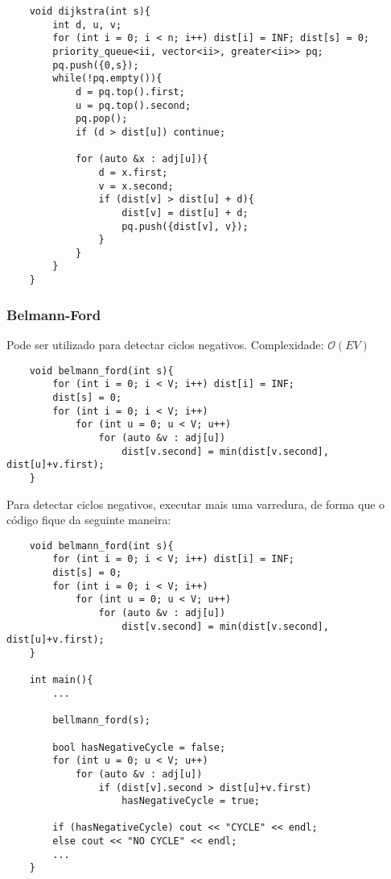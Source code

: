 \begin{verbatim}
    void dijkstra(int s){
        int d, u, v;
        for (int i = 0; i < n; i++) dist[i] = INF; dist[s] = 0;
        priority_queue<ii, vector<ii>, greater<ii>> pq;
        pq.push({0,s});
        while(!pq.empty()){
            d = pq.top().first;
            u = pq.top().second;
            pq.pop();
            if (d > dist[u]) continue;

            for (auto &x : adj[u]){
                d = x.first;
                v = x.second;
                if (dist[v] > dist[u] + d){
                    dist[v] = dist[u] + d; 
                    pq.push({dist[v], v});
                }   
            }
        }
    }

\end{verbatim}

\subsubsection{Belmann-Ford}
\par Pode ser utilizado para detectar ciclos negativos.
Complexidade: $\mathcal{O}(EV)$

\begin{verbatim}
    void belmann_ford(int s){
        for (int i = 0; i < V; i++) dist[i] = INF;
        dist[s] = 0;
        for (int i = 0; i < V; i++)
            for (int u = 0; u < V; u++)
                for (auto &v : adj[u])
                    dist[v.second] = min(dist[v.second], dist[u]+v.first);
    }
\end{verbatim}

\par Para detectar ciclos negativos, executar mais uma varredura, de forma que o código 
fique da seguinte maneira:

\begin{verbatim}
    void belmann_ford(int s){
        for (int i = 0; i < V; i++) dist[i] = INF;
        dist[s] = 0;
        for (int i = 0; i < V; i++)
            for (int u = 0; u < V; u++)
                for (auto &v : adj[u])
                    dist[v.second] = min(dist[v.second], dist[u]+v.first);
    }

    int main(){
        ...

        bellmann_ford(s);

        bool hasNegativeCycle = false;
        for (int u = 0; u < V; u++)
            for (auto &v : adj[u])
                if (dist[v].second > dist[u]+v.first)
                    hasNegativeCycle = true;

        if (hasNegativeCycle) cout << "CYCLE" << endl;
        else cout << "NO CYCLE" << endl;
        ...
    }
\end{verbatim}


